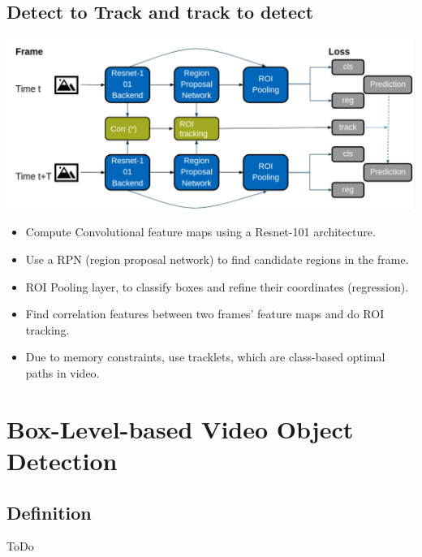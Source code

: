 \documentclass[conference]{IEEEtran}
\begin{document}
\subsection{Detect to Track and track to detect}
\includegraphics[width=\columnwidth]{D&T-architecture}
\begin{itemize}
	\item Compute Convolutional feature maps using a Resnet-101 architecture.
	\item Use a RPN (region proposal network) to find candidate regions in the frame.
	\item ROI Pooling layer, to classify boxes and refine their coordinates (regression).
	\item Find correlation features between two frames’ feature maps and do ROI tracking.
	\item Due to memory constraints, use tracklets, which are class-based optimal paths in video.

\end{itemize}

\section{Box-Level-based Video Object Detection}

\subsection{Definition}
ToDo
\end{document}
